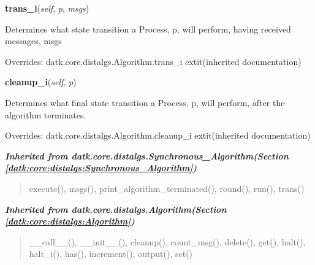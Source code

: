 \hspace{.8\funcindent}\begin{boxedminipage}{\funcwidth}

    \raggedright \textbf{trans\_i}(\textit{self}, \textit{p}, \textit{msgs})

\setlength{\parskip}{2ex}
    Determines what state transition a Process, p, will perform, having 
    received messages, msgs

\setlength{\parskip}{1ex}
      Overrides: datk.core.distalgs.Algorithm.trans\_i 	extit{(inherited documentation)}

    \end{boxedminipage}

    \vspace{0.5ex}

\hspace{.8\funcindent}\begin{boxedminipage}{\funcwidth}

    \raggedright \textbf{cleanup\_i}(\textit{self}, \textit{p})

\setlength{\parskip}{2ex}
    Determines what final state transition a Process, p, will perform, 
    after the algorithm terminates.

\setlength{\parskip}{1ex}
      Overrides: datk.core.distalgs.Algorithm.cleanup\_i 	extit{(inherited documentation)}

    \end{boxedminipage}


\large{\textbf{\textit{Inherited from datk.core.distalgs.Synchronous\_Algorithm\textit{(Section \ref{datk:core:distalgs:Synchronous_Algorithm})}}}}

\begin{quote}
execute(), msgs(), print\_algorithm\_terminated(), round(), run(), trans()
\end{quote}

\large{\textbf{\textit{Inherited from datk.core.distalgs.Algorithm\textit{(Section \ref{datk:core:distalgs:Algorithm})}}}}

\begin{quote}
\_\_call\_\_(), \_\_init\_\_(), cleanup(), count\_msg(), delete(), get(), halt(), halt\_i(), has(), increment(), output(), set()
\end{quote}


